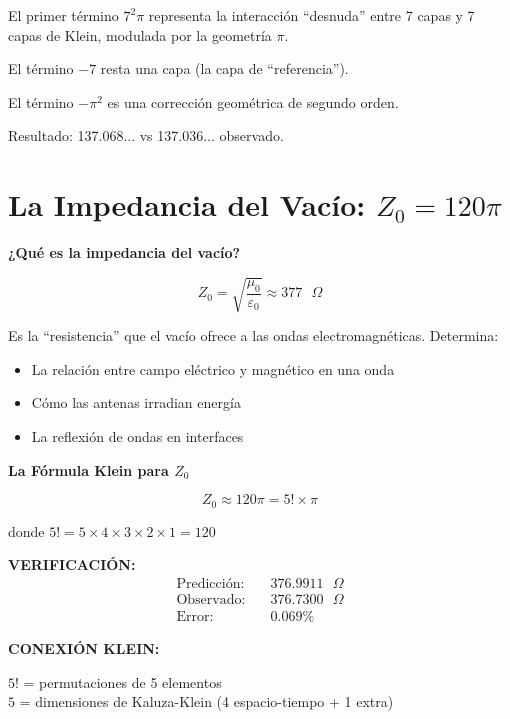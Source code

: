 El primer término $7^2\pi$ representa la interacción ``desnuda'' entre
7 capas y 7 capas de Klein, modulada por la geometría $\pi$.

El término $-7$ resta una capa (la capa de ``referencia'').

El término $-\pi^2$ es una corrección geométrica de segundo orden.

Resultado: 137.068... vs 137.036... observado.


\section{La Impedancia del Vacío: $Z_0 = 120\pi$}

\begin{nivelconceptual}
\textbf{¿Qué es la impedancia del vacío?}

\begin{equation}
Z_0 = \sqrt{\frac{\mu_0}{\varepsilon_0}} \approx 377 \text{ }\Omega
\end{equation}

Es la ``resistencia'' que el vacío ofrece a las ondas electromagnéticas.
Determina:
\begin{itemize}
    \item La relación entre campo eléctrico y magnético en una onda
    \item Cómo las antenas irradian energía
    \item La reflexión de ondas en interfaces
\end{itemize}
\end{nivelconceptual}

\begin{nivelmatematico}
\textbf{La Fórmula Klein para $Z_0$}

\begin{equation}
\boxed{Z_0 \approx 120\pi = 5! \times \pi}
\end{equation}

donde $5! = 5 \times 4 \times 3 \times 2 \times 1 = 120$

\textbf{VERIFICACIÓN:}
\begin{align}
\text{Predicción:} & \quad 376.9911 \text{ }\Omega\\
\text{Observado:} & \quad 376.7300 \text{ }\Omega\\
\text{Error:} & \quad 0.069\%
\end{align}

\textbf{CONEXIÓN KLEIN:}

$5!$ = permutaciones de 5 elementos\\
$5$ = dimensiones de Kaluza-Klein (4 espacio-tiempo + 1 extra)
\end{nivelmatematico}

